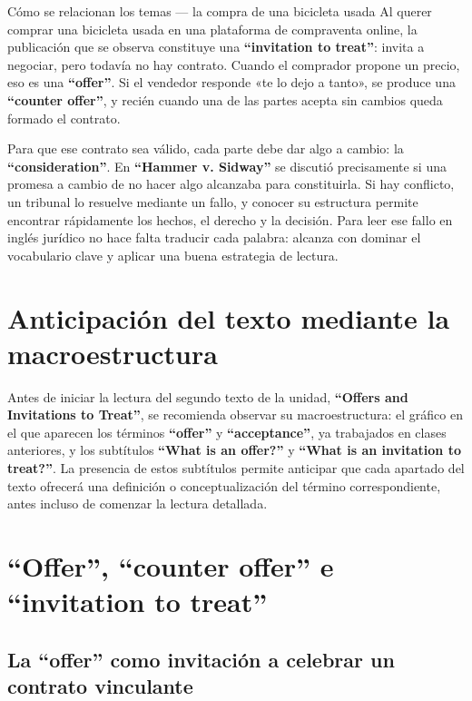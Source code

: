 \documentclass[12pt,oneside]{book}
\begin{document}
\begin{example}{Cómo se relacionan los temas --- la compra de una bicicleta usada}
Al querer comprar una bicicleta usada en una plataforma de compraventa online, la publicación que se observa constituye una \textbf{``invitation to treat''}: invita a negociar, pero todavía no hay contrato. Cuando el comprador propone un precio, eso es una \textbf{``offer''}. Si el vendedor responde «te lo dejo a tanto», se produce una \textbf{``counter offer''}, y recién cuando una de las partes acepta sin cambios queda formado el contrato.

Para que ese contrato sea válido, cada parte debe dar algo a cambio: la \textbf{``consideration''}. En \textbf{``Hammer v. Sidway''} se discutió precisamente si una promesa a cambio de no hacer algo alcanzaba para constituirla. Si hay conflicto, un tribunal lo resuelve mediante un fallo, y conocer su estructura permite encontrar rápidamente los hechos, el derecho y la decisión. Para leer ese fallo en inglés jurídico no hace falta traducir cada palabra: alcanza con dominar el vocabulario clave y aplicar una buena estrategia de lectura.
\end{example}

\section{Anticipación del texto mediante la macroestructura}

Antes de iniciar la lectura del segundo texto de la unidad, \textbf{``Offers and Invitations to Treat''}, se recomienda observar su macroestructura: el gráfico en el que aparecen los términos \textbf{``offer''} y \textbf{``acceptance''}, ya trabajados en clases anteriores, y los subtítulos \textbf{``What is an offer?''} y \textbf{``What is an invitation to treat?''}. La presencia de estos subtítulos permite anticipar que cada apartado del texto ofrecerá una definición o conceptualización del término correspondiente, antes incluso de comenzar la lectura detallada.

\section{\texorpdfstring{``Offer'', ``counter offer'' e ``invitation to treat''}{Offer, counter offer e invitation to treat}}

\subsection{La ``offer'' como invitación a celebrar un contrato vinculante}
\end{document}
